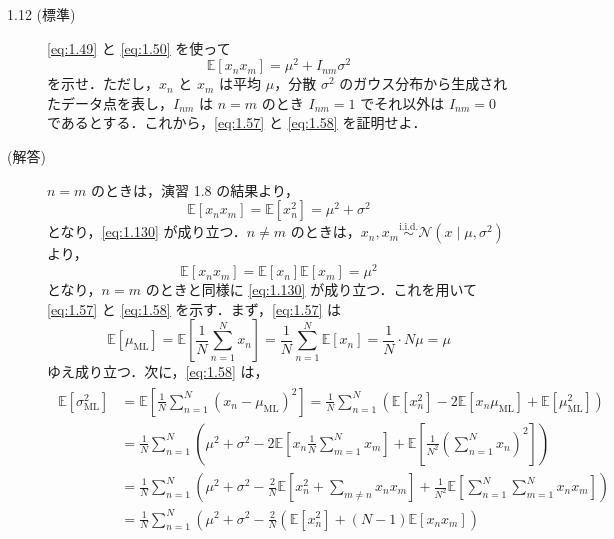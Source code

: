 \documentclass[uplatex,a4paper,oneside,openany,dvipdfmx]{jsarticle}
\numberwithin{equation}{section}
\theoremstyle{mystyle} %
\newcommand{\BE}{\mathbb{E}}
\newcommand{\CN}{\mathcal{N}}
\begin{document}
\begin{description}
\item[1.12 (標準)]  \eqref{eq:1.49} と \eqref{eq:1.50} を使って
\begin{equation} \label{eq:1.130}
    \BE[x_{n}x_{m}] = \mu^{2} + I_{nm}\sigma^{2}
\end{equation}
を示せ．ただし，$x_{n}$ と $x_{m}$ は平均 $\mu$，分散 $\sigma^{2}$ のガウス分布から生成されたデータ点を表し，$I_{nm}$ は $n=m$ のとき $I_{nm}=1$ でそれ以外は $I_{nm}=0$ であるとする．これから，\eqref{eq:1.57} と \eqref{eq:1.58} を証明せよ．

\item[(解答)] $n=m$ のときは，演習 1.8 の結果より，
\begin{equation}
    \BE[x_{n}x_{m}] = \BE[x_{n}^{2}] = \mu^{2} + \sigma^{2}
\end{equation}
となり，\eqref{eq:1.130} が成り立つ．$n \neq m$ のときは，$x_{n},x_{m} \overset{\text{i.i.d.}}{\sim} \CN(x \mid \mu,\sigma^{2})$ より，
\begin{equation}
    \BE[x_{n}x_{m}] = \BE[x_{n}]\BE[x_{m}] = \mu^{2}
\end{equation}
となり，$n=m$ のときと同様に \eqref{eq:1.130} が成り立つ．これを用いて \eqref{eq:1.57} と \eqref{eq:1.58} を示す．まず，\eqref{eq:1.57} は
\begin{equation}
    \BE[\mu_{\text{ML}}] = \BE\left[\frac{1}{N} \sum_{n=1}^{N} x_{n}\right] = \frac{1}{N} \sum_{n=1}^{N} \BE[x_{n}] = \frac{1}{N} \cdot N\mu = \mu
\end{equation}
ゆえ成り立つ．次に，\eqref{eq:1.58} は，
\begin{align}
    \begin{aligned}
        \BE[\sigma_{\text{ML}}^{2}] &= \BE\left[\frac{1}{N} \sum_{n=1}^{N} (x_{n}-\mu_{\text{ML}})^{2}\right] = \frac{1}{N} \sum_{n=1}^{N} \left(\BE[x_{n}^{2}] - 2\BE[x_{n}\mu_{\text{ML}}] + \BE[\mu_{\text{ML}}^{2}]\right) \\
        &= \frac{1}{N} \sum_{n=1}^{N} \left(\mu^{2} + \sigma^{2} - 2\BE\left[x_{n} \frac{1}{N} \sum_{m=1}^{N} x_{m}\right] + \BE\left[\frac{1}{N^{2}} \left(\sum_{n=1}^{N} x_{n}\right)^{2}\right]\right) \\
        &= \frac{1}{N} \sum_{n=1}^{N} \left(\mu^{2} + \sigma^{2} - \frac{2}{N} \BE\left[x_{n}^{2} + \sum_{m \neq n} x_{n}x_{m}\right] + \frac{1}{N^{2}} \BE\left[\sum_{n=1}^{N} \sum_{m=1}^{N} x_{n}x_{m}\right]\right) \\
        &= \frac{1}{N} \sum_{n=1}^{N} \left(\mu^{2} + \sigma^{2} - \frac{2}{N} \left(\BE[x_{n}^{2}] + (N-1) \BE[x_{n}x_{m}]\right) \right.\\

\end{aligned}
\end{align}
\end{description}
\end{document}
